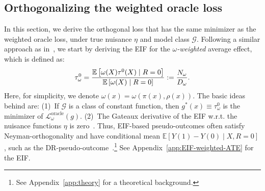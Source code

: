 \documentclass{article}
\theoremstyle{plain}
\theoremstyle{definition}
\theoremstyle{remark}
\newcommand{\E}{\mathbb{E}}                %
\newcommand{\1}{\mathds{1}}                %
\begin{document}
\subsection{Orthogonalizing the weighted oracle loss}
\label{subsec:ortho-weight-loss}

In this section, we derive the orthogonal loss that has the same minimizer as the weighted oracle loss, under true nuisance $\eta$ and model class $\mathcal{G}$. Following a similar approach as in~\cite{Morzywolek.2023}, we start by deriving the EIF for the \emph{$\omega$-weighted} average effect, which is defined as:
\begin{equation}
\vspace{-0.1cm}
\label{eq:walte-def}
    \tau^0_\omega =\frac{\E\left[\omega(X)\tau^0(X)\mid R=0\right]}{\E\left[\omega(X)\mid R=0\right]}:= \frac{N_\omega}{D_\omega}.
\end{equation}
Here, for simplicity, we denote $\omega(x)=\omega(\pi(x),\rho(x))$. The basic ideas behind are: (1)~If $\mathcal{G}$ is a class of constant function, then $g^*(x) \equiv \tau^0_\omega$ is the minimizer of $\mathcal{L}_\omega^{\text{oracle}}(g)$. (2)~The Gateaux derivative of the EIF w.r.t. the nuisance functions $\eta$ is zero~\cite{Chernozhukov.2018}. Thus, EIF-based pseudo-outcomes often satisfy Neyman-orthogonality and have conditional mean $\E[Y(1)-Y(0)\mid X,R=0]$, such as the DR-pseudo-outcome~\cite{Kennedy.2020-DR-learner}.\footnote{See Appendix~\ref{app:theory} for a theoretical background.} See Appendix~\ref{app:EIF-weighted-ATE} for the EIF.
\end{document}
